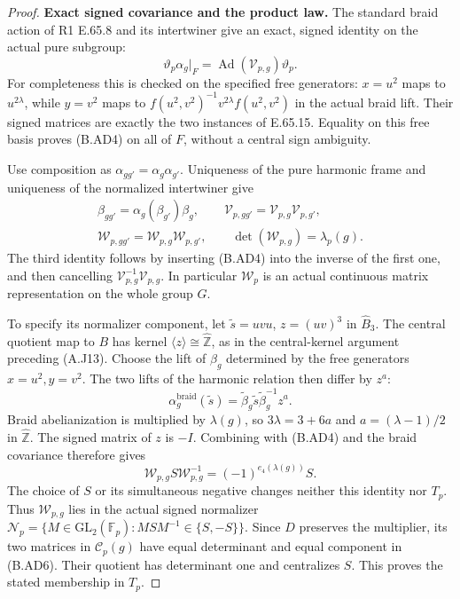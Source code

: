 \begin{proof}
\par\medskip\noindent\textbf{Exact signed covariance and the product law.}\quad
The standard braid action of R1 E.65.8 and its intertwiner
give an exact, signed identity on the actual pure subgroup:
\[
 \vartheta_p\alpha_g|_F
       =\operatorname{Ad}(\mathcal V_{p,g})\vartheta_p.
                                                               \tag{B.AD4}
\]
For completeness this is checked on the specified free
generators: $x=u^2$ maps to $u^{2\lambda}$, while $y=v^2$
maps to $f(u^2,v^2)^{-1}v^{2\lambda}f(u^2,v^2)$ in the
actual braid lift.  Their signed matrices are exactly
the two instances of E.65.15.  Equality on this free
basis proves (B.AD4) on all of $F$, without a central
sign ambiguity.

Use composition as $\alpha_{gg'}=\alpha_g\alpha_{g'}$.
Uniqueness of the pure harmonic frame and uniqueness
of the normalized intertwiner give
\[
\begin{gathered}
 \beta_{gg'}=\alpha_g(\beta_{g'})\beta_g,\qquad
 \mathcal V_{p,gg'}=\mathcal V_{p,g}\mathcal V_{p,g'},\\
 \mathcal W_{p,gg'}=\mathcal W_{p,g}\mathcal W_{p,g'},
 \qquad \det(\mathcal W_{p,g})=\lambda_p(g).
\end{gathered}                                                   \tag{B.AD5}
\]
The third identity follows by inserting (B.AD4) into
the inverse of the first one, and then cancelling
$\mathcal V_{p,g}^{-1}\mathcal V_{p,g}$.
In particular $\mathcal W_p$ is an actual continuous
matrix representation on the whole group $G$.

To specify its normalizer component, let
$\widetilde s=uvu$, $z=(uv)^3$ in $\widehat B_3$.
The central quotient map to $B$ has kernel
$\langle z\rangle\cong\widehat{\mathbb Z}$, as in
the central-kernel argument preceding (A.J13).
Choose the lift of $\beta_g$ determined by the free
generators $x=u^2,y=v^2$.
The two lifts of the harmonic relation then differ
by $z^a$:
\[
 \alpha_g^{\mathrm{braid}}(\widetilde s)
        =\widetilde\beta_g\widetilde s
                         \widetilde\beta_g^{-1}z^a.
\]
Braid abelianization is multiplied by $\lambda(g)$,
so $3\lambda=3+6a$ and
$a=(\lambda-1)/2$ in $\widehat{\mathbb Z}$.
The signed matrix of $z$ is $-I$.  Combining with
(B.AD4) and the braid covariance therefore gives
\[
 \mathcal W_{p,g}S\mathcal W_{p,g}^{-1}
                       =(-1)^{e_4(\lambda(g))}S.                \tag{B.AD6}
\]
The choice of $S$ or its simultaneous negative changes
neither this identity nor $T_p$.
Thus $\mathcal W_{p,g}$ lies in the actual signed
normalizer
$\mathscr N_p=\{M\in\mathrm{GL}_2(\mathbb F_p):
MSM^{-1}\in\{S,-S\}\}$.
Since $D$ preserves the multiplier, its two matrices
in $\mathscr C_p(g)$ have equal determinant and equal
component in (B.AD6).  Their quotient has determinant
one and centralizes $S$.  This proves the stated
membership in $T_p$.


\end{proof}
